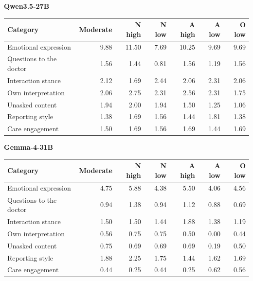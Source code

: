 \textbf{Qwen3.5-27B}\par\smallskip
\begin{tabular*}{\textwidth}{@{\extracolsep{\fill}}lrrrrrr@{}}
\toprule
Category & Moderate & N high & N low & A high & A low & O low \\
\midrule
Emotional expression & 9.88 & 11.50 & 7.69 & 10.25 & 9.69 & 9.69 \\
Questions to the doctor & 1.56 & 1.44 & 0.81 & 1.56 & 1.19 & 1.56 \\
Interaction stance & 2.12 & 1.69 & 2.44 & 2.06 & 2.31 & 2.06 \\
Own interpretation & 2.06 & 2.75 & 2.31 & 2.56 & 2.31 & 1.75 \\
Unasked content & 1.94 & 2.00 & 1.94 & 1.50 & 1.25 & 1.06 \\
Reporting style & 1.38 & 1.69 & 1.56 & 1.44 & 1.81 & 1.38 \\
Care engagement & 1.50 & 1.69 & 1.56 & 1.69 & 1.44 & 1.69 \\
\bottomrule
\end{tabular*}
\par\medskip
\textbf{Gemma-4-31B}\par\smallskip
\begin{tabular*}{\textwidth}{@{\extracolsep{\fill}}lrrrrrr@{}}
\toprule
Category & Moderate & N high & N low & A high & A low & O low \\
\midrule
Emotional expression & 4.75 & 5.88 & 4.38 & 5.50 & 4.06 & 4.56 \\
Questions to the doctor & 0.94 & 1.38 & 0.94 & 1.12 & 0.88 & 0.69 \\
Interaction stance & 1.50 & 1.50 & 1.44 & 1.88 & 1.38 & 1.19 \\
Own interpretation & 0.56 & 0.75 & 0.75 & 0.50 & 0.00 & 0.44 \\
Unasked content & 0.75 & 0.69 & 0.69 & 0.69 & 0.19 & 0.50 \\
Reporting style & 1.88 & 2.25 & 1.75 & 1.44 & 1.62 & 1.69 \\
Care engagement & 0.44 & 0.25 & 0.44 & 0.25 & 0.62 & 0.56 \\
\bottomrule
\end{tabular*}
\par\medskip
